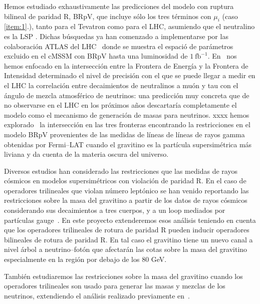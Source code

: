 Hemos estudiado exhaustivamente las predicciones del modelo con
ruptura bilineal de paridad R, BRpV, que incluye sólo los tres
términos con $\mu_i$ (caso \ref{item:1}.), tanto para el Tevatron como
para el LHC, asumiendo que el neutralino es la LSP
\cite{Magro:2003zb,deCampos:2005ri,deCampos:2007bn,deCampos:2008ic,deCampos:2008re,DeCampos:2010yu}. Dichas
búsquedas ya han comenzado a implementarse por las colaboración ATLAS
del LHC~\cite{:2011iu} donde se muestra el espació de parámetros
excluido en el cMSSM con BRpV hasta una luminosidad de $1\
\text{fb}^{-1}$.  En~\cite{DeCampos:2010yu} nos hemos enfocado en la
intersección entre la Frontera de Energía y la Frontera de Intensidad
determinado el nivel de precisión con el que se puede llegar a medir
en el LHC la correlación entre decaimientos de neutralinos a muón y
tau con el ángulo de mezcla atmosférico de neutrinos: una predicción
muy concreta que de no observarse en el LHC en los próximos años
descartaría completamente el modelo como el mecanismo de generación de
masas para neutrinos. xxxx hemos explorado~\cite{} la intersección en
las tres fronteras encontrando la restricciones en el modelo BRpV
provenientes de las medidas de líneas de líneas de rayos gamma
obtenidas por Fermi--LAT cuando el gravitino es la partícula
supersimétrica más liviana y da cuenta de la materia oscura del
universo. 

\begin{gravitinodm}
  Diversos estudios han considerado las restricciones que las medidas
  de rayos cósmicos en modelos supersimétricos con violación de
  paridad R. En el caso de operadores trilineales que violan número
  leptónico se han venido reportando las restricciones sobre la masa del
  gravitino a partir de los datos de rayos cósmicos considerando sus
  decaimientos a tres cuerpos, y a un loop mediados por partículas
  gauge~\cite{}. En este proyecto extenderemos esos análisis teniendo en
  cuenta que los operadores trilineales de rotura de paridad R pueden
  inducir operadores bilineales de rotura de paridad R. En tal caso el
  gravitino tiene un nuevo canal a nivel árbol a neutrino--fotón que
  afectarán las cotas sobre la masa del gravitino especialmente en la
  región por debajo de los 80 GeV. 

  También estudiaremos las restricciones sobre la masa del gravitino
  cuando los operadores trilineales son usado para generar las masas y
  mezclas de los neutrinos, extendiendo el análisis realizado
  previamente en~\cite{}.
\end{gravitinodm}

